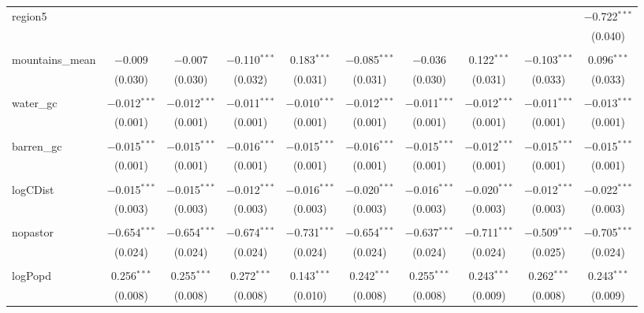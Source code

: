 \begin{table}[!htbp]
\begin{tabular}{@{\extracolsep{5pt}}lccccccccc}
 region5 &  &  &  &  &  &  &  &  & $-$0.722$^{***}$ \\ 
  &  &  &  &  &  &  &  &  & (0.040) \\ 
  & & & & & & & & & \\ 
 mountains\_mean & $-$0.009 & $-$0.007 & $-$0.110$^{***}$ & 0.183$^{***}$ & $-$0.085$^{***}$ & $-$0.036 & 0.122$^{***}$ & $-$0.103$^{***}$ & 0.096$^{***}$ \\ 
  & (0.030) & (0.030) & (0.032) & (0.031) & (0.031) & (0.030) & (0.031) & (0.033) & (0.033) \\ 
  & & & & & & & & & \\ 
 water\_gc & $-$0.012$^{***}$ & $-$0.012$^{***}$ & $-$0.011$^{***}$ & $-$0.010$^{***}$ & $-$0.012$^{***}$ & $-$0.011$^{***}$ & $-$0.012$^{***}$ & $-$0.011$^{***}$ & $-$0.013$^{***}$ \\ 
  & (0.001) & (0.001) & (0.001) & (0.001) & (0.001) & (0.001) & (0.001) & (0.001) & (0.001) \\ 
  & & & & & & & & & \\ 
 barren\_gc & $-$0.015$^{***}$ & $-$0.015$^{***}$ & $-$0.016$^{***}$ & $-$0.015$^{***}$ & $-$0.016$^{***}$ & $-$0.015$^{***}$ & $-$0.012$^{***}$ & $-$0.015$^{***}$ & $-$0.015$^{***}$ \\ 
  & (0.001) & (0.001) & (0.001) & (0.001) & (0.001) & (0.001) & (0.001) & (0.001) & (0.001) \\ 
  & & & & & & & & & \\ 
 logCDist & $-$0.015$^{***}$ & $-$0.015$^{***}$ & $-$0.012$^{***}$ & $-$0.016$^{***}$ & $-$0.020$^{***}$ & $-$0.016$^{***}$ & $-$0.020$^{***}$ & $-$0.012$^{***}$ & $-$0.022$^{***}$ \\ 
  & (0.003) & (0.003) & (0.003) & (0.003) & (0.003) & (0.003) & (0.003) & (0.003) & (0.003) \\ 
  & & & & & & & & & \\ 
 nopastor & $-$0.654$^{***}$ & $-$0.654$^{***}$ & $-$0.674$^{***}$ & $-$0.731$^{***}$ & $-$0.654$^{***}$ & $-$0.637$^{***}$ & $-$0.711$^{***}$ & $-$0.509$^{***}$ & $-$0.705$^{***}$ \\ 
  & (0.024) & (0.024) & (0.024) & (0.024) & (0.024) & (0.024) & (0.024) & (0.025) & (0.024) \\ 
  & & & & & & & & & \\ 
 logPopd & 0.256$^{***}$ & 0.255$^{***}$ & 0.272$^{***}$ & 0.143$^{***}$ & 0.242$^{***}$ & 0.255$^{***}$ & 0.243$^{***}$ & 0.262$^{***}$ & 0.243$^{***}$ \\ 
  & (0.008) & (0.008) & (0.008) & (0.010) & (0.008) & (0.008) & (0.009) & (0.008) & (0.009) \\ 

\end{tabular}
\end{table}
